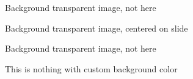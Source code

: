 \documentclass{beamer}
\begin{document}
\begin{frame}
Background transparent image, not here
\end{frame}

{

\begin{frame}
Background transparent image, centered on slide
\end{frame}}

\usebackgroundtemplate{ }    %

\begin{frame}
Background transparent image, not here
\end{frame}

\begin{frame}
This is nothing with custom background color
\end{frame}
\end{document}
